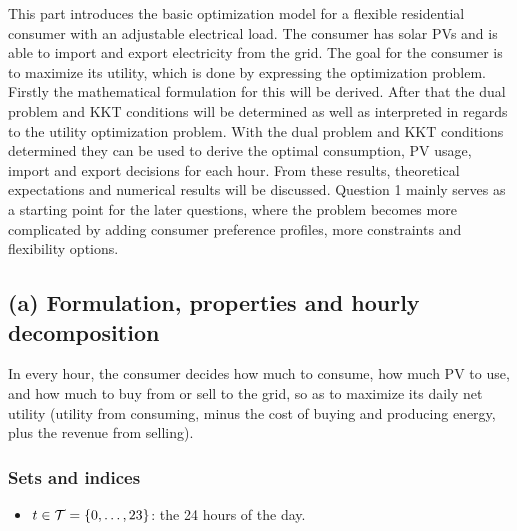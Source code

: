 This part introduces the basic optimization model for a flexible residential consumer with an adjustable electrical load. The consumer has solar PVs and is able to import and export electricity from the grid. The goal for the consumer is to maximize its utility, which is done by expressing the optimization problem. Firstly the mathematical formulation for this will be derived. After that the dual problem and KKT conditions will be determined as well as interpreted in regards to the utility optimization problem. With the dual problem and KKT conditions determined they can be used to derive the optimal consumption, PV usage, import and export decisions for each hour. From these results, theoretical expectations and numerical results will be discussed. Question 1 mainly serves as a starting point for the later questions, where the problem becomes more complicated by adding consumer preference profiles, more constraints and flexibility options.


\subsection{(a) Formulation, properties and hourly decomposition}

In every hour, the consumer decides how much to consume, how much PV to use, and how much
to buy from or sell to the grid, so as to maximize its daily net utility (utility from
consuming, minus the cost of buying and producing energy, plus the revenue from selling).

\subsubsection{Sets and indices}
\begin{itemize}
    \item $t \in \mathcal{T} = \{0, \dots, 23\}$: the 24 hours of the day.
\end{itemize}

